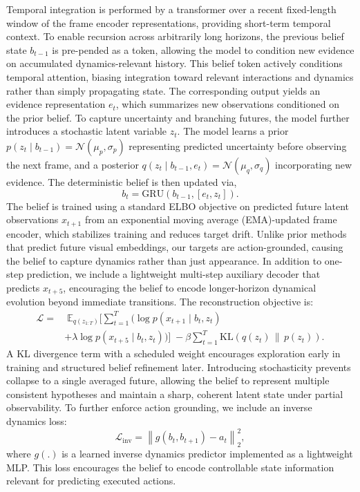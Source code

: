 \documentclass[conference]{IEEEtran}
\begin{document}
Temporal integration is performed by a transformer over a recent fixed-length window of the frame encoder representations, providing short-term temporal context. To enable recursion across arbitrarily long horizons, the previous belief state $b_{t-1}$ is pre-pended as a token, allowing the model to condition new evidence on accumulated dynamics-relevant history. This belief token actively conditions temporal attention, biasing integration toward relevant interactions and dynamics rather than simply propagating state. The corresponding output yields an evidence representation $e_t$, which summarizes new observations conditioned on the prior belief. To capture uncertainty and branching futures, the model further introduces a stochastic latent variable $z_t$. The model learns a prior $p(z_t \mid b_{t-1}) = \mathcal{N}(\mu_p, \sigma_p)$ representing predicted uncertainty before observing the next frame, and a posterior $q(z_t \mid b_{t-1}, e_t) = \mathcal{N}(\mu_q, \sigma_q)$ incorporating new evidence. The deterministic belief is then updated via,
\[
b_t = \mathrm{GRU}\!\left(b_{t-1}, [e_t, z_t]\right).
\] 
The belief is trained using a standard ELBO objective on predicted future latent observations $x_{t+1}$ from an exponential moving average (EMA)-updated frame encoder, which stabilizes training and reduces target drift. Unlike prior methods \cite{chen2025vl} that predict future visual embeddings, our targets are action-grounded, causing the belief to capture dynamics rather than just appearance. In addition to one-step prediction, we include a lightweight multi-step auxiliary decoder that predicts $x_{t+5}$, encouraging the belief to encode longer-horizon dynamical evolution beyond immediate transitions. The reconstruction objective is:
\begin{equation}
\begin{aligned}
\mathcal{L}
=&\;
\mathbb{E}_{q(z_{1:T})}
\Bigg[
\sum_{t=1}^{T}
\Big(
\log p(x_{t+1} \mid b_t, z_t)  \\
&
+ \lambda \log p(x_{t+5} \mid b_t,z_t)
\Big)
\Bigg]  
\;-
\beta
\sum_{t=1}^{T}
\mathrm{KL}\!\left(q(z_t) \,\|\, p(z_t)\right).
\end{aligned}
\end{equation}
A KL divergence term with a scheduled weight encourages exploration early in training and structured belief refinement later. Introducing stochasticity prevents collapse to a single averaged future, allowing the belief to represent multiple consistent hypotheses and maintain a sharp, coherent latent state under partial observability.
To further enforce action grounding, we include an inverse dynamics loss:
\[
\mathcal{L}_{\text{inv}}
=
\left\lVert g(b_t, b_{t+1}) - a_t \right\rVert_2^2,
\]
where $g(.)$ is a learned inverse dynamics predictor implemented as a lightweight MLP.
This loss encourages the belief to encode controllable state information relevant for predicting executed actions.
\end{document}
